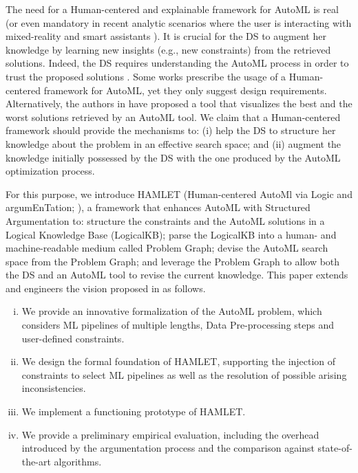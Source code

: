 \documentclass[5p,times]{elsarticle}
\newcommand{\mf}[1]{#1}
\begin{document}
The need for a Human-centered and explainable framework for AutoML is real \cite{gil2019towards, lee2020human, wang2019human} (or even mandatory in recent analytic scenarios where the user is interacting with mixed-reality and smart assistants \cite{DBLP:conf/dolap/FranciaGR19,DBLP:journals/is/FranciaGG22}).
It is crucial for the DS to augment her knowledge by learning new insights (e.g., new constraints) from the retrieved solutions.
Indeed, the DS requires understanding the AutoML process in order to trust the proposed solutions \cite{drozdal2020trust}.
Some works \cite{gil2019towards, lee2020human, wang2019human} prescribe the usage of a Human-centered framework for AutoML, yet they only suggest design requirements.
Alternatively, the authors in \cite{ono2020pipelineprofiler} have proposed a tool that visualizes the best and the worst solutions retrieved by an AutoML tool.
We claim that a Human-centered framework should provide the mechanisms to: (i) help the DS to structure her knowledge about the problem in an effective search space; and (ii) augment the knowledge initially possessed by the DS with the one produced by the AutoML optimization process. 

For this purpose, we introduce HAMLET (Human-centered AutoMl via Logic and argumEnTation; ), a framework that enhances AutoML with Structured Argumentation to:
structure the constraints and the AutoML solutions in a Logical Knowledge Base (LogicalKB);
parse the LogicalKB into a human- and machine-readable medium called Problem Graph;
devise the AutoML search space from the Problem Graph;
and leverage the Problem Graph to allow both the DS and an AutoML tool to revise the current knowledge.
This paper extends and engineers the vision proposed in \cite{DBLP:conf/edbt/GiovanelliP22} as follows.
\begin{enumerate}[(i)]
    \item We provide an innovative formalization of the AutoML problem, which considers ML pipelines of multiple lengths, Data Pre-processing steps and user-defined constraints.
    \item We design the formal foundation of HAMLET, supporting the injection of constraints to select ML pipelines as well as the resolution of possible arising inconsistencies.
    \item We implement a functioning prototype of HAMLET.
    \item We provide a preliminary empirical evaluation, \mf{including the overhead introduced by the argumentation process and the comparison against state-of-the-art algorithms}. 
\end{enumerate}
\end{document}

